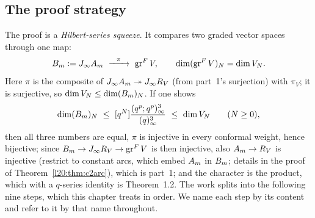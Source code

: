 \subsection{The proof strategy}

The proof is a \emph{Hilbert-series squeeze}. It compares two graded vector spaces through one map:
\begin{equation*}
\ltwentyB:=\ltwentyJ\ltwentyA\ \xrightarrow{\ \ \pi\ \ }\ \ltwentygr V,\qquad
\dim(\ltwentygr V)_N=\dim V_N .
\end{equation*}
Here $\pi$ is the composite of $J_\infty A_m\twoheadrightarrow J_\infty R_V$ (from part~1's surjection)
with $\pi_V$; it is surjective, so $\dim V_N\le\dim(B_m)_N$. If one shows
\begin{equation}\label{l20:eq:squeeze}
\dim(\ltwentyB)_N\ \le\ [q^N]\frac{(q^p;q^p)^3_\infty}{(q)^3_\infty}\ \le\ \dim V_N\qquad(N\ge0),
\end{equation}
then all three numbers are equal, $\pi$ is injective in every conformal weight, hence bijective; since
$B_m\to J_\infty R_V\to\operatorname{gr}^F V$ is then injective, also $A_m\to R_V$ is injective (restrict to
constant arcs, which embed $A_m$ in $B_m$; details in the proof of Theorem~\ref{l20:thm:c2arc}), which is
part~1; and the character is the product, which with a $q$-series identity is Theorem~1.2. The work splits
into the following nine steps, which this chapter treats in order. We name each step by its content and
refer to it by that name throughout.

